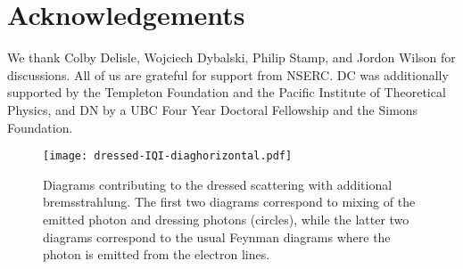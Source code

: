 \documentclass[twocolumn,prd]{revtex4}
\begin{document}
\section*{Acknowledgements}

We thank Colby Delisle, Wojciech Dybalski, Philip Stamp, and Jordon Wilson for discussions. All of us are grateful for support from NSERC. DC was additionally supported by the Templeton Foundation and the Pacific Institute of Theoretical Physics, and DN by a UBC Four Year Doctoral Fellowship and the Simons Foundation.





\begin{figure*}[!ht]
\texttt{[image: dressed-IQI-diaghorizontal.pdf]}
\caption{Diagrams contributing to the dressed scattering with additional bremsstrahlung. The first two diagrams correspond to mixing of the emitted photon and dressing photons (circles), while the latter two diagrams correspond to the usual Feynman diagrams where the photon is emitted from the electron lines.}
\label{diagrams}
\end{figure*}


\appendix
\label{factorizationapp}
\end{document}
